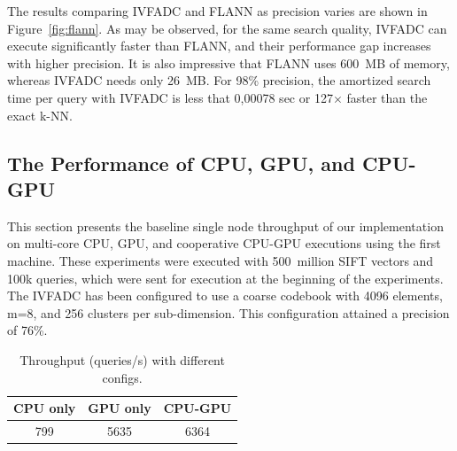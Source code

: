 The results comparing IVFADC and FLANN as precision varies are shown in 
Figure~\ref{fig:flann}. As may be observed, for the same search quality,
IVFADC can execute significantly faster than FLANN, and their
performance gap increases with higher precision. It is also 
impressive that FLANN uses 600~MB of memory, whereas IVFADC needs only 26~MB. 
For 98\% precision, the amortized search 
time per query with IVFADC is less that 0,00078 sec or 127$\times$ faster
than the exact k-NN.


\subsection{The Performance of CPU, GPU, and CPU-GPU}
\label{sec:in-core-throughput}

This section presents the baseline single node throughput of our implementation 
on multi-core CPU, GPU, and cooperative CPU-GPU executions using the 
first machine. These experiments were executed with 500~million SIFT vectors 
and 100k queries, which were sent for execution at the beginning of the experiments. 
The IVFADC has been configured to use a coarse codebook with 4096 elements, m=8, and 256 
clusters per sub-dimension. This configuration attained a precision of 76\%.


\begin{table}[htbp]
\caption{Throughput (queries/s) with different configs.}
\vspace{-4mm}
\begin{center}
\begin{tabular}{ccc}  
\hline
\textbf{CPU only}        & \textbf{GPU only}      &   \textbf{CPU-GPU} \\ \hline \hline
  799                    & 5635                   & 6364  \\ \hline
\end{tabular}
\label{tab:batch-throughput}
\end{center}
\end{table}

